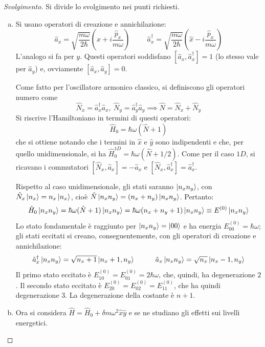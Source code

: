 \documentclass[11pt, a4paper]{scrartcl} %
\numberwithin{equation}{subsection}
\theoremstyle{style2}
\theoremstyle{style1}
\renewcommand\qedsymbol{$\blacksquare$}
\newenvironment{svolgimento}{\renewcommand\qedsymbol{$\spadesuit$}\begin{proof}[Svolgimento]}{\end{proof}}
\begin{document}
\begin{svolgimento}Si divide lo svolgimento nei punti richiesti.
	\begin{enumerate}[(a).]
		\item Si usano operatori di creazione e annichilazione:
			\[
			\hat{a}_x = \sqrt{\frac{m\omega}{2\hbar }} \left(\hat{x}+ i \frac{\hat{p}_x}{m\omega}\right) \hspace{1cm} \hat{a}_x^\dagger = \sqrt{\frac{m\omega}{2\hbar }} \left(\hat{x} - i \frac{\hat{p}_x}{m\omega}\right) 
			\] 
			L'analogo si fa per $y$.
			Questi operatori soddisfano $[\hat{a}_x, \hat{a}_x^\dagger ]= 1$ (lo stesso vale per $\hat{a}_y$) e, ovviamente $[\hat{a}_x,\hat{a}_y] = 0$.

			Come fatto per l'oscillatore armonico classico, si definiscono gli operatori numero come
			\[
			\hat{N}_x = \hat{a}^\dagger _x \hat{a}_x , \ \hat{N}_y= \hat{a}_y^\dagger \hat{a}_y \implies \hat{N} = \hat{N}_x + \hat{N}_y
			\] 
			Si riscrive l'Hamiltoniano in termini di questi operatori:
			\[
			\hat{H}_0 = \hbar  \omega (\hat{N} + 1) 
			\] 
			che si ottiene notando che i termini in $\hat{x}$ e $\hat{y}$ sono indipendenti e che, per quello unidimensionale, si ha $\hat{H}_0^{1D} = \hbar \omega(\hat{N} + 1 / 2)$.
			Come per il caso $1D$, si ricavano i commutatori $[\hat{N}_x, \hat{a}_x] = - \hat{a}_x$ e $[\hat{N}_x, \hat{a}_x^\dagger ] = \hat{a}_x ^\dagger $.

			Rispetto al caso unidimensionale, gli stati saranno $\ket{n_xn_y} $, con $\hat{N}_x \ket{n_x} = n_x \ket{n_x} $, cio\`e $\hat{N} \ket{n_xn_y} = (n_x+n_y) \ket{n_xn_y} $.
			Pertanto:
			\[
			\hat{H}_0 \ket{n_xn_y} = \hbar \omega (\hat{N} + 1 ) \ket{n_xn_y} = \hbar \omega (n_x + n_y+1)\ket{n_xn_y} \equiv E^{(0)} \ket{n_xn_y} 
			\] 
			Lo stato fondamentale \`e raggiunto per $\ket{n_xn_y} = \ket{00} $ e ha energia $E^{(0)} _{00} = \hbar \omega$; gli stati eccitati si creano, conseguentemente, con gli operatori di creazione e annichilazione:
			\[
			\hat{a}_x^\dagger \ket{n_xn_y} = \sqrt{n_x + 1} \ket{n_x + 1, n_y}  \hspace{1cm}\hat{a}_x \ket{n_xn_y}   = \sqrt{n_x} \ket{n_x - 1, n_y} 
			\] 
			Il primo stato eccitato \`e $E^{(0)} _{10} =E^{(0)} _{01} =2\hbar \omega$, che, quindi, ha degenerazione $2$.
			Il secondo stato eccitato \`e $E_{20} ^{(0)} = E_{02} ^{(0)} = E_{11}^{(0)} $, che ha quindi degenerazione $3$.
La degenerazione della costante \`e $n+1$.
\item Ora si considera $\hat{H} = \hat{H}_0 + \delta m\omega^2 \hat{x}\hat{y}$ e se ne studiano gli effetti sui livelli energetici.


\end{enumerate}
\end{svolgimento}
\end{document}
